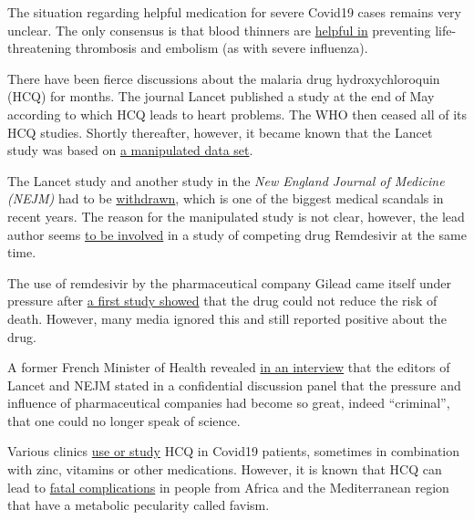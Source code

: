 The situation regarding helpful medication for severe Covid19 cases
remains very unclear. The only consensus is that blood thinners are
\href{https://www.webmd.com/lung/news/20200506/blood-thinners-could-boost-covid19-survival}{helpful
in} preventing life-threatening thrombosis and embolism (as with severe
influenza).

There have been fierce discussions about the malaria drug
hydroxychloroquin (HCQ) for months. The journal Lancet published a study
at the end of May according to which HCQ leads to heart problems. The
WHO then ceased all of its HCQ studies. Shortly thereafter, however, it
became known that the Lancet study was based on
\href{https://www.theguardian.com/world/2020/jun/03/covid-19-surgisphere-who-world-health-organization-hydroxychloroquine}{a
manipulated data set}.

The Lancet study and another study in the \emph{New England Journal of
Medicine (NEJM)} had to be
\href{https://www.bloomberg.com/news/articles/2020-06-04/researchers-retract-lancet-study-linking-malaria-drug-to-risks}{withdrawn},
which is one of the biggest medical scandals in recent years. The reason
for the manipulated study is not clear, however, the lead author seems
\href{https://www.medicineuncensored.com/a-study-out-of-thin-air}{to be
involved} in a study of competing drug Remdesivir at the same time.

The use of remdesivir by the pharmaceutical company Gilead came itself
under pressure after
\href{https://edition.cnn.com/2020/05/22/health/remdesivir-covid-19-trial-results-nejm-study/index.html}{a
first study showed} that the drug could not reduce the risk of death.
However, many media ignored this and still reported positive about the
drug.

A former French Minister of Health revealed
\href{https://www.youtube.com/watch?v=ZYgiCALEdpE}{in an interview} that
the editors of Lancet and NEJM stated in a confidential discussion panel
that the pressure and influence of pharmaceutical companies had become
so great, indeed ``criminal'', that one could no longer speak of
science.

Various clinics
\href{https://www.webmd.com/lung/news/20200409/chloroquine-zinc-tested-to-block-covid-infection}{use
or study} HCQ in Covid19 patients, sometimes in combination with zinc,
vitamins or other medications. However, it is known that HCQ can lead to
\href{https://off-guardian.org/2020/05/13/covid19-a-case-for-medical-detectives/}{fatal
complications} in people from Africa and the Mediterranean region that
have a metabolic pecularity called favism.

